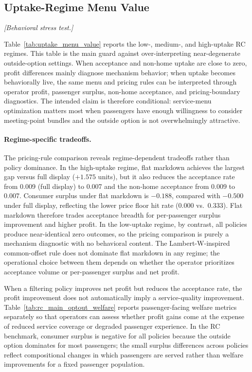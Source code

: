 \subsection{Uptake-Regime Menu Value}
\label{sec:uptake_regime}

\textit{[Behavioral stress test.]}


Table~\ref{tab:uptake_menu_value} reports the low-, medium-, and high-uptake RC regimes. This table is the main guard against over-interpreting near-degenerate outside-option settings. When acceptance and non-home uptake are close to zero, profit differences mainly diagnose mechanism behavior; when uptake becomes behaviorally live, the same menu and pricing rules can be interpreted through operator profit, passenger surplus, non-home acceptance, and pricing-boundary diagnostics. The intended claim is therefore conditional: service-menu optimization matters most when passengers have enough willingness to consider meeting-point bundles and the outside option is not overwhelmingly attractive.

\paragraph{Regime-specific tradeoffs.}
The pricing-rule comparison reveals regime-dependent tradeoffs rather than policy dominance. In the high-uptake regime, flat markdown achieves the largest gap versus full display ($+1.575$ units), but it also reduces the acceptance rate from 0.009 (full display) to 0.007 and the non-home acceptance from 0.009 to 0.007. Consumer surplus under flat markdown is $-0.188$, compared with $-0.500$ under full display, reflecting the lower price floor hit rate (0.000 vs.\ 0.333). Flat markdown therefore trades acceptance breadth for per-passenger surplus improvement and higher profit. In the low-uptake regime, by contrast, all policies produce near-identical zero outcomes, so the pricing comparison is purely a mechanism diagnostic with no behavioral content. The Lambert-W-inspired common-offset rule does not dominate flat markdown in any regime; the operational choice between them depends on whether the operator prioritizes acceptance volume or per-passenger surplus and net profit.

When a filtering policy improves net profit but reduces the acceptance rate, the profit improvement does not automatically imply a service-quality improvement. Table~\ref{tab:rc_main_optout_welfare} reports passenger-facing welfare metrics separately so that operators can assess whether profit gains come at the expense of reduced service coverage or degraded passenger experience. In the RC benchmark, consumer surplus is negative for all policies because the outside option dominates for most passengers; the small surplus differences across policies reflect compositional changes in which passengers are served rather than welfare improvements for a fixed passenger population.

